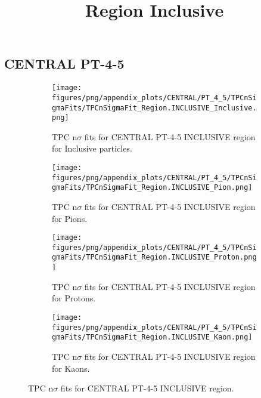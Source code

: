             \subsection{CENTRAL PT-4-5}
            \begin{figure}[H]
                \title{Region Inclusive}
                \begin{subfigure}[b]{0.5\textwidth}
                    \centering
                    \texttt{[image: figures/png/appendix\_plots/CENTRAL/PT\_4\_5/TPCnSigmaFits/TPCnSigmaFit\_Region.INCLUSIVE\_Inclusive.png]}
                    \caption{TPC n$\sigma$ fits for CENTRAL PT-4-5 INCLUSIVE region for Inclusive particles.}
                    \label{fig:appendix_CENTRAL_PT-4-5_INCLUSIVE_Inclusive}
                \end{subfigure}
                \begin{subfigure}[b]{0.5\textwidth}
                    \centering
                    \texttt{[image: figures/png/appendix\_plots/CENTRAL/PT\_4\_5/TPCnSigmaFits/TPCnSigmaFit\_Region.INCLUSIVE\_Pion.png]}
                    \caption{TPC n$\sigma$ fits for CENTRAL PT-4-5 INCLUSIVE region for Pions.}
                    \label{fig:appendix_CENTRAL_PT-4-5_INCLUSIVE_Pion}
                \end{subfigure}
                \begin{subfigure}[b]{0.5\textwidth}
                    \centering
                    \texttt{[image: figures/png/appendix\_plots/CENTRAL/PT\_4\_5/TPCnSigmaFits/TPCnSigmaFit\_Region.INCLUSIVE\_Proton.png]}
                    \caption{TPC n$\sigma$ fits for CENTRAL PT-4-5 INCLUSIVE region for Protons.}
                    \label{fig:appendix_CENTRAL_PT-4-5_INCLUSIVE_Proton}
                \end{subfigure}
                \begin{subfigure}[b]{0.5\textwidth}
                    \centering
                    \texttt{[image: figures/png/appendix\_plots/CENTRAL/PT\_4\_5/TPCnSigmaFits/TPCnSigmaFit\_Region.INCLUSIVE\_Kaon.png]}
                    \caption{TPC n$\sigma$ fits for CENTRAL PT-4-5 INCLUSIVE region for Kaons.}
                    \label{fig:appendix_CENTRAL_PT-4-5_INCLUSIVE_Kaon}
                \end{subfigure}
                \caption{TPC n$\sigma$ fits for CENTRAL PT-4-5 INCLUSIVE region.}
                \label{fig:appendix_CENTRAL_PT-4-5_INCLUSIVE}
            \end{figure}

